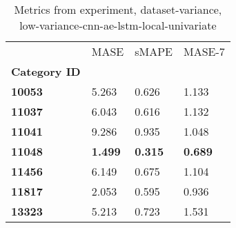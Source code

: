 \begin{table}[H]
\centering
\caption{Metrics from experiment, dataset-variance, low-variance-cnn-ae-lstm-local-univariate}
\label{table:low-variance-cnn-ae-lstm-local-univariate-dataset-variance}
\begin{tabular}{llll}
\toprule
{} &            MASE &           sMAPE &          MASE-7 \\
\textbf{Category ID} &                 &                 &                 \\
\midrule
\textbf{10053      } &           5.263 &           0.626 &           1.133 \\
\textbf{11037      } &           6.043 &           0.616 &           1.132 \\
\textbf{11041      } &           9.286 &           0.935 &           1.048 \\
\textbf{11048      } &  \textbf{1.499} &  \textbf{0.315} &  \textbf{0.689} \\
\textbf{11456      } &           6.149 &           0.675 &           1.104 \\
\textbf{11817      } &           2.053 &           0.595 &           0.936 \\
\textbf{13323      } &           5.213 &           0.723 &           1.531 \\
\bottomrule
\end{tabular}
\end{table}
